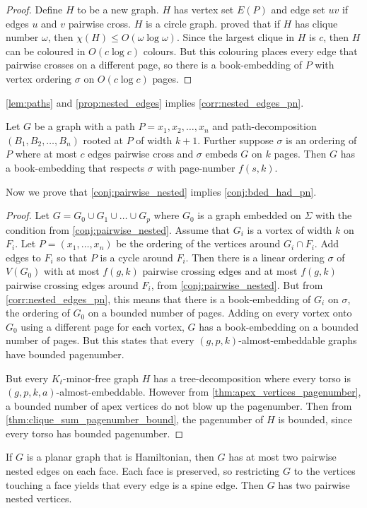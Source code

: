 \begin{proof}
    Define $H$ to be a new graph. $H$ has vertex set $E(P)$ and edge set $uv$ if edges $u$ and $v$ pairwise cross. $H$ is a circle graph. \textcite{daviesImprovedBoundsColouring2022} proved that if $H$ has clique number $\omega$, then $\chi(H) \leq O(\omega \log \omega)$. Since the largest clique in $H$ is $c$, then $H$ can be coloured in $O(c \log c)$ colours. But this colouring places every edge that pairwise crosses on a different page, so there is a book-embedding of $P$ with vertex ordering $\sigma$ on $O(c \log c)$ pages.
\end{proof}

\cref{lem:paths} and \cref{prop:nested_edges} implies \cref{corr:nested_edges_pn}.

\begin{corollary}\label{corr:nested_edges_pn}
    Let $G$ be a graph with a path $P = x_1, x_2, \ldots, x_n$ and  path-decomposition $(B_1, B_2, \ldots, B_n)$ rooted at $P$ of width $k + 1$. Further suppose $\sigma$ is an ordering of $P$ where at most $c$ edges pairwise cross and $\sigma$ embeds $G$ on $k$ pages. Then $G$ has a book-embedding that respects $\sigma$ with page-number $f(s, k)$.
\end{corollary}

Now we prove that \cref{conj:pairwise_nested} implies \cref{conj:bded_had_pn}. 
\begin{proof}
    Let $G = G_0 \cup G_1 \cup \ldots \cup G_p$ where $G_0$ is a graph embedded on $\Sigma$ with the condition from \cref{conj:pairwise_nested}. Assume that $G_i$ is a vortex of width $k$ on $F_i$. Let $P = (x_1, \ldots, x_n)$ be the ordering of the vertices around $G_i \cap F_i$. Add edges to $F_i$ so that $P$ is a cycle around $F_i$. Then there is a linear ordering $\sigma$ of $V(G_0)$ with at most $f(g, k)$ pairwise crossing edges and at most $f(g, k)$ pairwise crossing edges around $F_i$, from \cref{conj:pairwise_nested}. But from \cref{corr:nested_edges_pn}, this means that there is a book-embedding of $G_i$ on $\sigma$, the ordering of $G_0$ on a bounded number of pages. Adding on every vortex onto $G_0$ using a different page for each vortex, $G$ has a book-embedding on a bounded number of pages. But this states that every $(g, p, k)$-almost-embeddable graphs have bounded pagenumber. 

    But every $K_t$-minor-free graph $H$ has a tree-decomposition where every torso is $(g, p, k, a)$-almost-embeddable. However from \cref{thm:apex_vertices_pagenumber}, a bounded number of apex vertices do not blow up the pagenumber. Then from \cref{thm:clique_sum_pagenumber_bound}, the pagenumber of $H$ is bounded, since every torso has bounded pagenumber.
\end{proof}

If $G$ is a planar graph that is Hamiltonian, then $G$ has at most two pairwise nested edges on each face. Each face is preserved, so restricting $G$ to the vertices touching a face yields that every edge is a spine edge. Then $G$ has two pairwise nested vertices. 